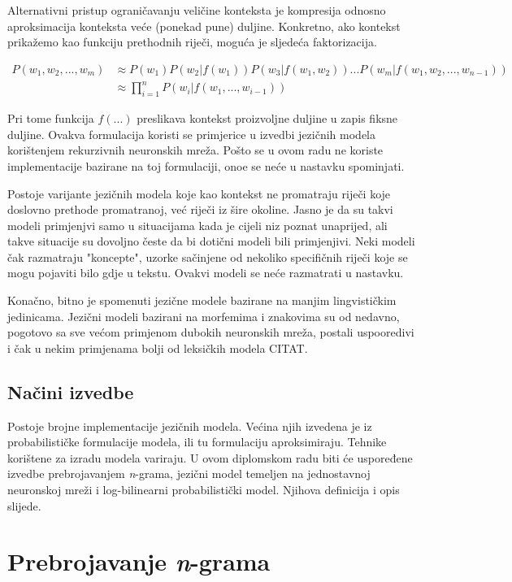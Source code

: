 \documentclass[times, utf8, diplomski, numeric]{fer}
\begin{document}
Alternativni pristup ograničavanju veličine konteksta je kompresija odnosno aproksimacija konteksta veće (ponekad pune) duljine. Konkretno, ako kontekst prikažemo kao funkciju prethodnih riječi, moguća je sljedeća faktorizacija.

\begin{align*}
P(w_1, w_2, ... , w_m)
  &\approx P(w_1) P(w_2 | f(w_1)) P(w_3 | f(w_1, w_2)) ... P(w_m | f(w_1, w_2, ... , w_{n - 1 })) \\
  &\approx \prod_{i = 1}^n{P(w_i | f(w_1, ... , w_{i - 1}))}
\end{align*}

Pri tome funkcija $f(...)$ preslikava kontekst proizvoljne duljine u zapis fiksne duljine. Ovakva formulacija koristi se primjerice u izvedbi jezičnih modela korištenjem rekurzivnih neuronskih mreža. Pošto se u ovom radu ne koriste implementacije bazirane na toj formulaciji, onoe se neće u nastavku spominjati.

Postoje varijante jezičnih modela koje kao kontekst ne promatraju riječi koje doslovno prethode promatranoj, već riječi iz šire okoline. Jasno je da su takvi modeli primjenjvi samo u situacijama kada je cijeli niz poznat unaprijed, ali takve situacije su dovoljno česte da bi dotični modeli bili primjenjivi. Neki modeli čak razmatraju "koncepte", uzorke sačinjene od nekoliko specifičnih riječi koje se mogu pojaviti bilo gdje u tekstu. Ovakvi modeli se neće razmatrati u nastavku.

Konačno, bitno je spomenuti jezične modele bazirane na manjim lingvističkim jedinicama. Jezični modeli bazirani na morfemima i znakovima su od nedavno, pogotovo sa sve većom primjenom dubokih neuronskih mreža, postali uspooredivi i čak u nekim primjenama bolji od leksičkih modela CITAT.

\section{Načini izvedbe}

Postoje brojne implementacije jezičnih modela. Većina njih izvedena je iz probabilističke formulacije modela, ili tu formulaciju aproksimiraju. Tehnike korištene za izradu modela variraju. U ovom diplomskom radu biti će uspoređene izvedbe prebrojavanjem \textit{n}-grama, jezični model temeljen na jednostavnoj neuronskoj mreži i log-bilinearni probabilistički model. Njihova definicija i opis slijede.

\chapter{Prebrojavanje \textit{n}-grama}
\end{document}
